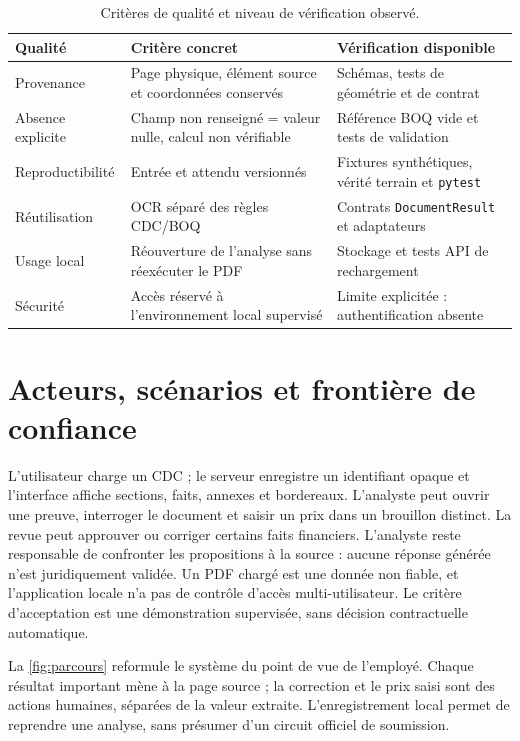 \begin{table}[htbp]\centering\tighttable
\begin{tabularx}{\textwidth}{@{}p{28mm}Y Y@{}}\toprule
Qualité & Critère concret & Vérification disponible\\\midrule
Provenance & Page physique, élément source et coordonnées conservés & Schémas, tests de géométrie et de contrat\\
Absence explicite & Champ non renseigné = valeur nulle, calcul non vérifiable & Référence BOQ vide et tests de validation\\
Reproductibilité & Entrée et attendu versionnés & Fixtures synthétiques, vérité terrain et \texttt{pytest}\\
Réutilisation & OCR séparé des règles CDC/BOQ & Contrats \texttt{DocumentResult} et adaptateurs\\
Usage local & Réouverture de l'analyse sans réexécuter le PDF & Stockage et tests API de rechargement\\
Sécurité & Accès réservé à l'environnement local supervisé & Limite explicitée : authentification absente\\\bottomrule
\end{tabularx}
\caption{Critères de qualité et niveau de vérification observé.}\label{tab:nonfonctionnels}
\end{table}

\section{Acteurs, scénarios et frontière de confiance}
L'utilisateur charge un CDC ; le serveur enregistre un identifiant opaque et l'interface affiche sections, faits, annexes et bordereaux. L'analyste peut ouvrir une preuve, interroger le document et saisir un prix dans un brouillon distinct. La revue peut approuver ou corriger certains faits financiers. L'analyste reste responsable de confronter les propositions à la source : aucune réponse générée n'est juridiquement validée. Un PDF chargé est une donnée non fiable, et l'application locale n'a pas de contrôle d'accès multi-utilisateur. Le critère d'acceptation est une démonstration supervisée, sans décision contractuelle automatique.

La \autoref{fig:parcours} reformule le système du point de vue de l'employé. Chaque résultat important mène à la page source ; la correction et le prix saisi sont des actions humaines, séparées de la valeur extraite. L'enregistrement local permet de reprendre une analyse, sans présumer d'un circuit officiel de soumission.

